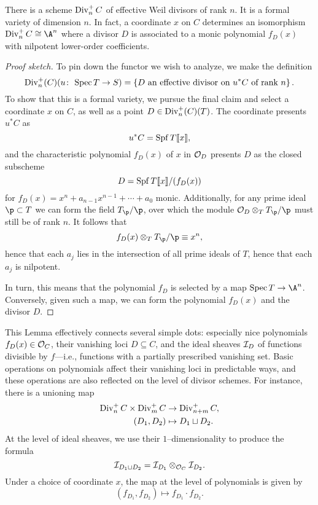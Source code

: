\begin{lemma}
There is a scheme \(\operatorname{Div}_n^+ C\) of effective Weil divisors of rank \(n\).  It is a formal variety of dimension \(n\).  In fact, a coordinate \(x\) on \(C\) determines an isomorphism \(\Div_n^+ C \cong \A^n\) where a divisor \(D\) is associated to a monic polynomial \(f_D(x)\) with nilpotent lower-order coefficients.
\end{lemma}
\begin{proof}[Proof sketch]
To pin down the functor we wish to analyze, we make the definition \[\operatorname{Div}_n^+(C)(u\colon\thinspace \operatorname{Spec} T \to S) = \left\{\text{\(D\) an effective divisor on \(u^* C\) of rank \(n\)}\right\}.\]  To show that this is a formal variety, we pursue the final claim and select a coordinate \(x\) on \(C\), as well as a point \(D \in \operatorname{Div}_n^+(C)(T)\).  The coordinate presents \(u^* C\) as \[u^* C = \operatorname{Spf} T\llbracket x \rrbracket,\] and the characteristic polynomial \(f_D(x)\) of \(x\) in \(\mathcal{O}_D\) presents \(D\) as the closed subscheme \[D = \operatorname{Spf} T\llbracket x \rrbracket / (f_D(x))\] for \(f_D(x) = x^n + a_{n-1} x^{n-1} + \cdots + a_0\) monic.  Additionally, for any prime ideal \(\p \subset T\) we can form the field \(T_{\p} / \p\), over which the module \(\sheaf O_D \otimes_T T_{\p} / \p\) must still be of rank \(n\).  It follows that \[f_D(x) \otimes_T T_{\p} / \p \equiv x^n,\] hence that each \(a_j\) lies in the intersection of all prime ideals of \(T\), hence that each \(a_j\) is nilpotent.

In turn, this means that the polynomial \(f_D\) is selected by a map \(\Spec T \to \A^n\).  Conversely, given such a map, we can form the polynomial \(f_D(x)\) and the divisor \(D\).
\end{proof}

\begin{remark}\label{DescriptionOfSqCupMapOnPolynomials}
This Lemma effectively connects several simple dots: especially nice polynomials \(f_D(x) \in \mathcal{O}_C\), their vanishing loci \(D \subseteq C\), and the ideal sheaves \(\mathcal{I}_D\) of functions divisible by \(f\)---i.e., functions with a partially prescribed vanishing set.  Basic operations on polynomials affect their vanishing loci in predictable ways, and these operations are also reflected on the level of divisor schemes.  For instance, there is a unioning map
\begin{align*}
\operatorname{Div}_n^+ C \times \operatorname{Div}_m^+ C & \to \operatorname{Div}_{n+m}^+ C, \\
(D_1, D_2) & \mapsto D_1 \sqcup D_2.
\end{align*}
At the level of ideal sheaves, we use their \(1\)--dimensionality to produce the formula \[\mathcal{I}_{D_1 \sqcup D_2} = \mathcal{I}_{D_1} \otimes_{\mathcal{O}_C} \mathcal{I}_{D_2}.\]  Under a choice of coordinate \(x\), the map at the level of polynomials is given by \[(f_{D_1}, f_{D_2}) \mapsto f_{D_1} \cdot f_{D_2}.\]
\end{remark}

